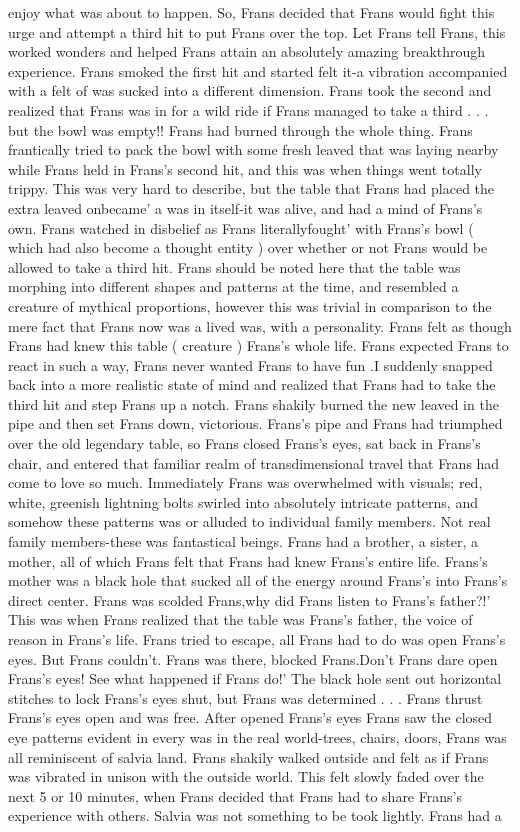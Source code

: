 \documentclass[12pt]{book}
\begin{document}
enjoy what was about to happen. So, Frans decided that Frans would fight this urge and attempt a third hit to put Frans over the top. Let Frans tell Frans, this worked wonders and helped Frans attain an absolutely amazing breakthrough experience. Frans smoked the first hit and started felt it-a vibration accompanied with a felt of was sucked into a different dimension. Frans took the second and realized that Frans was in for a wild ride if Frans managed to take a third . . .  but the bowl was empty!! Frans had burned through the whole thing. Frans frantically tried to pack the bowl with some fresh leaved that was laying nearby while Frans held in Frans's second hit, and this was when things went totally trippy. This was very hard to describe, but the table that Frans had placed the extra leaved onbecame' a was in itself-it was alive, and had a mind of Frans's own. Frans watched in disbelief as Frans literallyfought' with Frans's bowl ( which had also become a thought entity ) over whether or not Frans would be allowed to take a third hit. Frans should be noted here that the table was morphing into different shapes and patterns at the time, and resembled a creature of mythical proportions, however this was trivial in comparison to the mere fact that Frans now was a lived was, with a personality. Frans felt as though Frans had knew this table ( creature ) Frans's whole life. Frans expected Frans to react in such a way, Frans never wanted Frans to have fun .I suddenly snapped back into a more realistic state of mind and realized that Frans had to take the third hit and step Frans up a notch. Frans shakily burned the new leaved in the pipe and then set Frans down, victorious. Frans's pipe and Frans had triumphed over the old legendary table, so Frans closed Frans's eyes, sat back in Frans's chair, and entered that familiar realm of transdimensional travel that Frans had come to love so much. Immediately Frans was overwhelmed with visuals; red, white, greenish lightning bolts swirled into absolutely intricate patterns, and somehow these patterns was or alluded to individual family members. Not real family members-these was fantastical beings. Frans had a brother, a sister, a mother, all of which Frans felt that Frans had knew Frans's entire life. Frans's mother was a black hole that sucked all of the energy around Frans's into Frans's direct center. Frans was scolded Frans,why did Frans listen to Frans's father?!' This was when Frans realized that the table was Frans's father, the voice of reason in Frans's life. Frans tried to escape, all Frans had to do was open Frans's eyes. But Frans couldn't. Frans was there, blocked Frans.Don't Frans dare open Frans's eyes! See what happened if Frans do!' The black hole sent out horizontal stitches to lock Frans's eyes shut, but Frans was determined . . .  Frans thrust Frans's eyes open and was free. After opened Frans's eyes Frans saw the closed eye patterns evident in every was in the real world-trees, chairs, doors, Frans was all reminiscent of salvia land. Frans shakily walked outside and felt as if Frans was vibrated in unison with the outside world. This felt slowly faded over the next 5 or 10 minutes, when Frans decided that Frans had to share Frans's experience with others. Salvia was not something to be took lightly. Frans had a 
\end{document}
